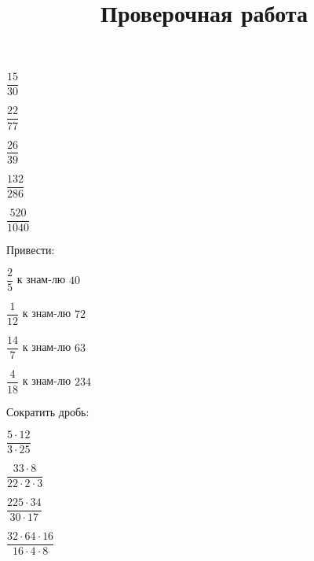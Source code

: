 \begin{listofex}
	\begin{enumcols}[itemcolumns=5]
		\item \( \dfrac{15}{30} \)
		\item \( \dfrac{22}{77} \)
		\item \( \dfrac{26}{39} \)
		\item \( \dfrac{132}{286} \)
		\item \( \dfrac{520}{1040} \)
	\end{enumcols}
	\item Привести:
	\begin{enumcols}[itemcolumns=4]
		\item \( \dfrac{2}{5} \) к знам-лю \( 40 \)
		\item \( \dfrac{1}{12} \) к знам-лю \( 72 \)
		\item \( \dfrac{14}{7} \) к знам-лю \( 63 \)
		\item \( \dfrac{4}{18} \) к знам-лю \( 234 \)
	\end{enumcols}
	\item Сократить дробь:
	\begin{enumcols}[itemcolumns=4]
		\item \( \dfrac{5\cdot12}{3\cdot25} \)
		\item \( \dfrac{33\cdot8}{22\cdot2\cdot3} \)
		\item \( \dfrac{225\cdot34}{30\cdot17} \)
		\item \( \dfrac{32\cdot64\cdot16}{16\cdot4\cdot8} \)
	\end{enumcols}
\end{listofex}
\newpage
\title{Проверочная работа}
